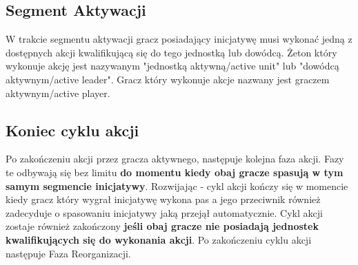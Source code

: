 	\subsection{Segment Aktywacji}
	W trakcie segmentu aktywacji gracz posiadający inicjatywę musi wykonać jedną z dostępnych akcji kwalifikującą się do tego jednostką lub dowódcą. Żeton który wykonuje akcję jest nazywanym "jednostką aktywną/active unit" lub "dowódcą aktywnym/active leader". Gracz który wykonuje akcje nazwany jest graczem aktywnym/active player.
	\subsection{Koniec cyklu akcji}
	Po zakończeniu akcji przez gracza aktywnego, następuje kolejna faza akcji. Fazy te odbywają się bez limitu \textbf{do momentu kiedy obaj gracze spasują w tym samym segmencie inicjatywy}. Rozwijając - cykl akcji kończy się w momencie kiedy gracz który wygrał inicjatywę wykona pas a jego przeciwnik również zadecyduje o spasowaniu inicjatywy jaką przejął automatycznie. Cykl akcji zostaje również zakończony \textbf{jeśli obaj gracze nie posiadają jednostek kwalifikujących się do wykonania akcji}. Po zakończeniu cyklu akcji następuje Faza Reorganizacji.

